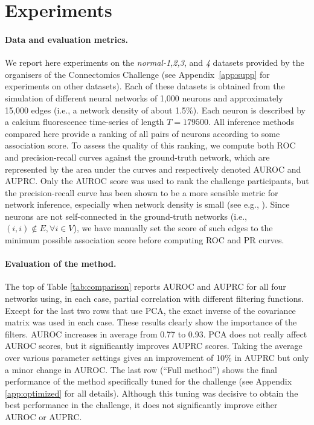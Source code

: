 \documentclass[wcp]{jmlr}
\begin{document}
\section{Experiments} \label{sec:results}
\paragraph{Data and evaluation metrics.}

We report here experiments on the \textit{normal-1,2,3}, and \textit{4}
datasets provided by the organisers of the Connectomics Challenge (see
Appendix~\ref{app:supp} for experiments on other datasets). Each of
these datasets is obtained from the simulation \citep{stetter2012model} of
different neural networks of 1,000 neurons and approximately 15,000 edges (i.e., a
network density of about 1.5\%). Each neuron is described by a calcium
fluorescence time-series of length $T=179500$. All inference methods compared
here provide a ranking of all pairs of neurons according to some association score. To assess the quality of this ranking, we compute both ROC and
precision-recall curves against the ground-truth network, which are represented by
the area under the curves and respectively  denoted AUROC and AUPRC. Only
the AUROC score was used to rank the challenge participants, but the precision-recall curve has been shown to be a more sensible metric for network
inference, especially when network density is small (see e.g.,
\cite{schrynemackers2013protocols}). Since neurons are not self-connected in
the ground-truth networks (i.e., $(i, i) \not \in E, \forall i \in V$), we
have manually set the score of such edges to the minimum possible association
score before computing ROC and PR curves.

\paragraph{Evaluation of the method.}

The top of Table \ref{tab:comparison} reports AUROC and AUPRC for all
four networks using, in each case, partial correlation with different
filtering functions. Except for the last two rows that use PCA, the
exact inverse of the covariance matrix was used in each case. These
results clearly show the importance of the filters. AUROC increases in
average from 0.77 to 0.93. PCA does not really affect AUROC scores, but
it significantly improves AUPRC scores. Taking the average over
various parameter settings gives an improvement of 10\% in AUPRC but
only a minor change in AUROC. The last row (``Full method'') shows the
final performance of the method specifically tuned for the challenge
(see Appendix \ref{app:optimized} for all details). Although this
tuning was decisive to obtain the best performance in the challenge,
it does not significantly improve either AUROC or AUPRC.
\end{document}
